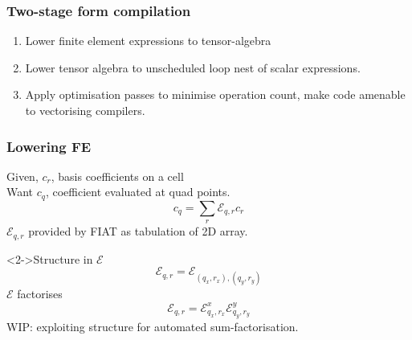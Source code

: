 \documentclass[presentation]{beamer}
\begin{document}
\begin{frame}
  \frametitle{Two-stage form compilation}
  \begin{enumerate}[<+->]
  \item Lower finite element expressions to tensor-algebra
  \item Lower tensor algebra to unscheduled loop nest of scalar
    expressions.
  \item Apply optimisation passes to minimise operation count, make
    code amenable to vectorising compilers.
  \end{enumerate}
\end{frame}
\begin{frame}
  \frametitle{Lowering FE}
  Given, $c_r$, basis coefficients on a cell\\
  Want $c_q$, coefficient evaluated at quad points.
  \begin{equation*}
    c_q = \sum_r \mathcal{E}_{q, r} c_r
  \end{equation*}
  $\mathcal{E}_{q, r}$ provided by FIAT as tabulation of 2D array.
  \begin{block}<2->{Structure in $\mathcal{E}$}
    \begin{equation*}
      \mathcal{E}_{q,r} = \mathcal{E}_{(q_x,r_x),(q_y, r_y)}
    \end{equation*}
    $\mathcal{E}$ factorises
    \begin{equation*}
      \mathcal{E}_{q, r} = \mathcal{E}^x_{q_x, r_x}
      \mathcal{E}^y_{q_y, r_y}
    \end{equation*}
    WIP: exploiting structure for automated sum-factorisation.
  \end{block}
\end{frame}
\end{document}
